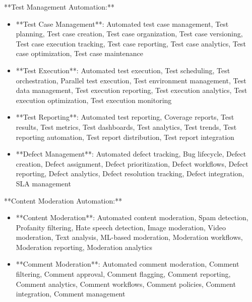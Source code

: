 \documentclass[11pt,a4paper]{article}
\begin{document}
**Test Management Automation:**

\begin{itemize}
\item **Test Case Management**: Automated test case management, Test planning, Test case creation, Test case organization, Test case versioning, Test case execution tracking, Test case reporting, Test case analytics, Test case optimization, Test case maintenance
\end{itemize}

\begin{itemize}
\item **Test Execution**: Automated test execution, Test scheduling, Test orchestration, Parallel test execution, Test environment management, Test data management, Test execution reporting, Test execution analytics, Test execution optimization, Test execution monitoring
\end{itemize}

\begin{itemize}
\item **Test Reporting**: Automated test reporting, Coverage reports, Test results, Test metrics, Test dashboards, Test analytics, Test trends, Test reporting automation, Test report distribution, Test report integration
\end{itemize}

\begin{itemize}
\item **Defect Management**: Automated defect tracking, Bug lifecycle, Defect creation, Defect assignment, Defect prioritization, Defect workflows, Defect reporting, Defect analytics, Defect resolution tracking, Defect integration, SLA management
\end{itemize}

**Content Moderation Automation:**

\begin{itemize}
\item **Content Moderation**: Automated content moderation, Spam detection, Profanity filtering, Hate speech detection, Image moderation, Video moderation, Text analysis, ML-based moderation, Moderation workflows, Moderation reporting, Moderation analytics
\end{itemize}

\begin{itemize}
\item **Comment Moderation**: Automated comment moderation, Comment filtering, Comment approval, Comment flagging, Comment reporting, Comment analytics, Comment workflows, Comment policies, Comment integration, Comment management
\end{itemize}
\end{document}
